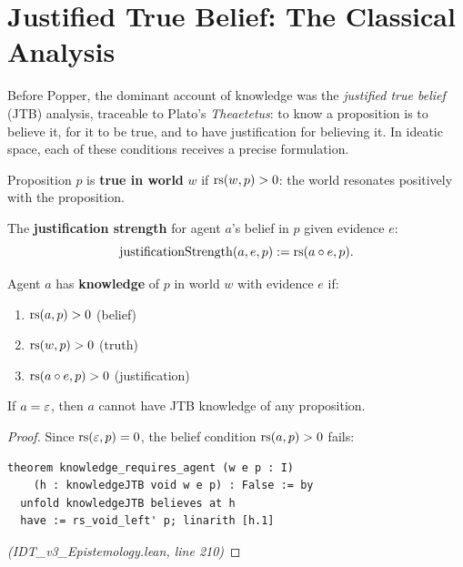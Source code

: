 \section{Justified True Belief: The Classical Analysis}

Before Popper, the dominant account of knowledge was the \emph{justified true
belief} (JTB) analysis, traceable to Plato's \textit{Theaetetus}: to know a
proposition is to believe it, for it to be true, and to have justification
for believing it. In ideatic space, each of these conditions receives a precise
formulation.

\begin{definition}
\label{def:truth-in-world}
Proposition $p$ is \textbf{true in world} $w$ if $\mathrm{rs}(w, p) > 0$:
the world resonates positively with the proposition.
\end{definition}

\begin{definition}
\label{def:justification-strength}
The \textbf{justification strength} for agent $a$'s belief in $p$ given evidence $e$:
\[
  \mathrm{justificationStrength}(a, e, p) := \mathrm{rs}(a \circ e, p).
\]
\end{definition}

\begin{definition}
\label{def:knowledge-jtb}
Agent $a$ has \textbf{knowledge} of $p$ in world $w$ with evidence $e$ if:
\begin{enumerate}
  \item $\mathrm{rs}(a, p) > 0$ \quad (belief)
  \item $\mathrm{rs}(w, p) > 0$ \quad (truth)
  \item $\mathrm{rs}(a \circ e, p) > 0$ \quad (justification)
\end{enumerate}
\end{definition}

\begin{theorem}
\label{thm:knowledge-requires-agent}
If $a = \varepsilon$, then $a$ cannot have JTB knowledge of any proposition.
\end{theorem}

\begin{proof}
Since $\mathrm{rs}(\varepsilon, p) = 0$, the belief condition $\mathrm{rs}(a, p) > 0$ fails:
\begin{lstlisting}
theorem knowledge_requires_agent (w e p : I)
    (h : knowledgeJTB void w e p) : False := by
  unfold knowledgeJTB believes at h
  have := rs_void_left' p; linarith [h.1]
\end{lstlisting}
\textit{(IDT\_v3\_Epistemology.lean, line 210)}
\end{proof}

